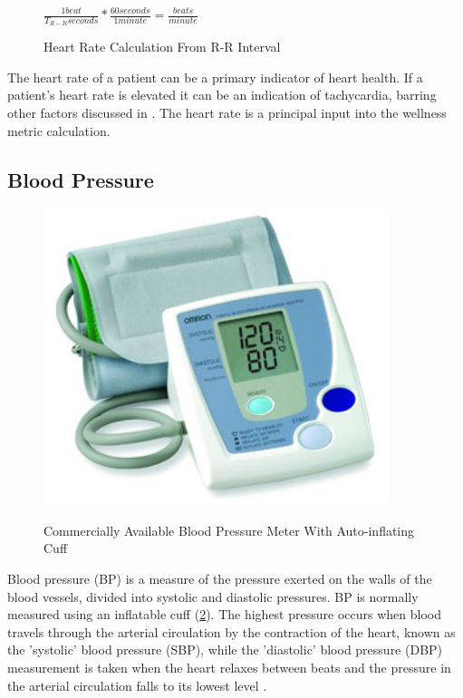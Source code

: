 \begin{figure}
	\begin{center}
		\label{fig:RR_PulseRateCalc}
		$\frac{1 beat}{T_{R-R} seconds}*\frac{60 seconds}{1 minute}=\frac{beats}{minute}$
		\caption{Heart Rate Calculation From R-R Interval}
	\end{center}
\end{figure}

The heart rate of a patient can be a primary indicator of heart health. If a patient's heart rate is elevated it can be an indication of tachycardia, barring other factors discussed in . The heart rate is a principal input into the wellness metric calculation.

\subsection{Blood Pressure}
\label{subsec:BloodPressure}
\begin{figure}
	\begin{center}
		\label{fig:BP_cuff}
		\includegraphics[scale=1,width=0.9\textwidth]{Images/BPCuff.png} 
		\caption{Commercially Available Blood Pressure Meter With Auto-inflating Cuff}
	\end{center}
\end{figure}

Blood pressure (BP) is a measure of the pressure exerted on the walls of the blood vessels, divided into systolic and diastolic pressures. BP is normally measured using an inflatable cuff (\cref{fig:BP_cuff}). The highest pressure occurs when blood travels through the arterial circulation by the contraction of the heart,  known as the 'systolic' blood pressure (SBP), while the 'diastolic' blood pressure (DBP) measurement is taken when the heart relaxes between beats and the pressure in the arterial circulation falls to its lowest level \cite{NOORDIN2009}. 

